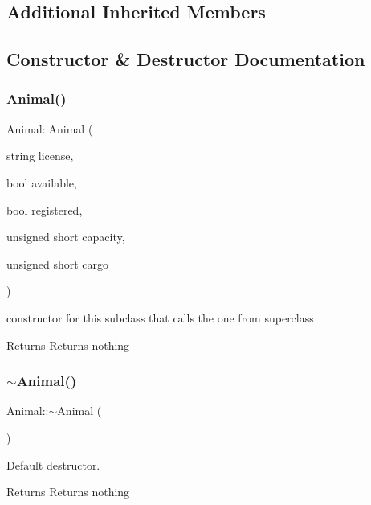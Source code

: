 \subsection*{Additional Inherited Members}


\subsection{Constructor \& Destructor Documentation}
\mbox{\label{class_animal_afdae9b8c4716472196e8cd62c762f88a}} 
\subsubsection{\texorpdfstring{Animal()}{Animal()}}
{\footnotesize\ttfamily Animal\+::\+Animal (\begin{DoxyParamCaption}\item[{string}]{license,  }\item[{bool}]{available,  }\item[{bool}]{registered,  }\item[{unsigned short}]{capacity,  }\item[{unsigned short}]{cargo }\end{DoxyParamCaption})}



constructor for this subclass that calls the one from superclass 

\begin{DoxyReturn}{Returns}
Returns nothing 
\end{DoxyReturn}
\mbox{\label{class_animal_a476af25adde5f0dfa688129c8f86fa5c}} 
\subsubsection{\texorpdfstring{$\sim$\+Animal()}{~Animal()}}
{\footnotesize\ttfamily Animal\+::$\sim$\+Animal (\begin{DoxyParamCaption}{ }\end{DoxyParamCaption})\hspace{0.3cm}{\ttfamily [inline]}}



Default destructor. 

\begin{DoxyReturn}{Returns}
Returns nothing 
\end{DoxyReturn}


